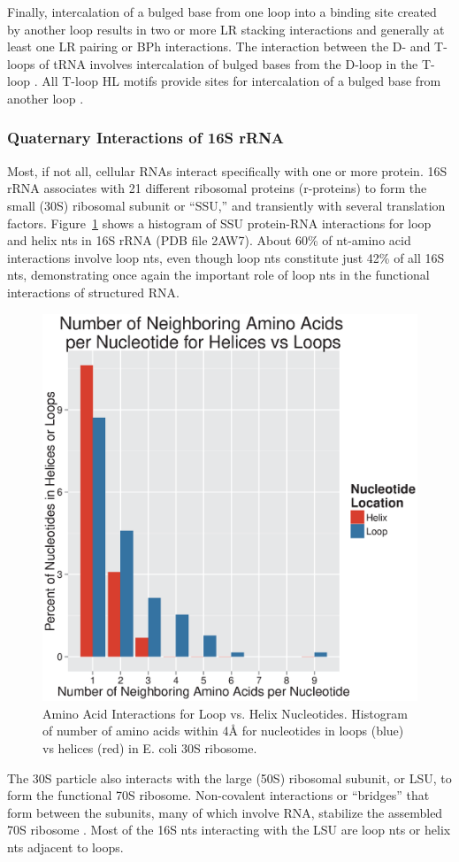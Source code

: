Finally, intercalation of a bulged base from one loop into a binding site
created by another loop results in two or more LR stacking interactions and
generally at least one LR pairing or BPh interactions. The interaction between
the D- and T-loops of tRNA involves intercalation of bulged bases from the
D-loop in the T-loop \cite{Quigley1976}. All T-loop HL motifs provide sites for
intercalation of a bulged base from another loop \cite{Nagaswamy2002}. 

\subsubsection{Quaternary Interactions of 16S rRNA}

Most, if not all, cellular RNAs interact specifically with one or more protein.
\EC{} 16S rRNA associates with 21 different ribosomal proteins (r-proteins) to
form the small (30S) ribosomal subunit or ``SSU,'' and transiently with several
translation factors. Figure~\ref{fig:aa-loop-v-nt} shows a histogram of SSU
protein-RNA interactions for loop and helix nts in 16S rRNA (PDB file 2AW7).
About 60\% of nt-amino acid interactions involve loop nts, even though loop nts
constitute just 42\% of all 16S nts, demonstrating once again the important role
of loop nts in the functional interactions of structured RNA.

\begin{figure}
  \includegraphics[width=0.5\linewidth]{chapter-1/figs/aa-loop-v-nt}
  \caption{Amino Acid Interactions for Loop vs. Helix Nucleotides. Histogram of
    number of amino acids within 4Å for nucleotides in loops (blue) vs helices
  (red) in E. coli 30S ribosome. }
  \label{fig:aa-loop-v-nt}
\end{figure}

The 30S particle also interacts with the large (50S) ribosomal subunit, or LSU,
to form the functional 70S ribosome. Non-covalent interactions or ``bridges''
that form between the subunits, many of which involve RNA, stabilize the
assembled 70S ribosome \cite{Yusupov2001}. Most of the 16S nts interacting with
the LSU are loop nts or helix nts adjacent to loops. 

